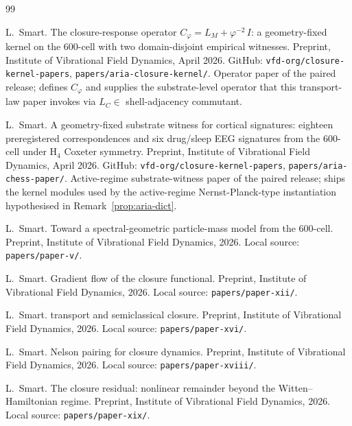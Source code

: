 \documentclass[11pt]{article}
\theoremstyle{definition}
\begin{document}

\begin{thebibliography}{99}

L.~Smart.
\newblock The closure-response operator $C_\varphi = L_M + \varphi^{-2}\, I$:
  a geometry-fixed kernel on the 600-cell with two domain-disjoint empirical
  witnesses.
\newblock Preprint, Institute of Vibrational Field Dynamics, April 2026.
\newblock GitHub: \texttt{vfd-org/closure-kernel-papers},
  \texttt{papers/aria-closure-kernel/}. Operator paper of the paired release;
  defines $C_\varphi$ and supplies the substrate-level operator that this
  transport-law paper invokes via $L_C \in$ shell-adjacency commutant.

L.~Smart.
\newblock A geometry-fixed substrate witness for cortical signatures: eighteen
  preregistered correspondences and six drug/sleep EEG signatures from the
  600-cell under H$_4$ Coxeter symmetry.
\newblock Preprint, Institute of Vibrational Field Dynamics, April 2026.
\newblock GitHub: \texttt{vfd-org/closure-kernel-papers},
  \texttt{papers/aria-chess-paper/}. Active-regime substrate-witness paper of the
  paired release; ships the kernel modules used by the active-regime
  Nernst-Planck-type instantiation hypothesised in Remark~\ref{prop:aria-dict}.

L.~Smart.
\newblock Toward a spectral-geometric particle-mass model from the 600-cell.
\newblock Preprint, Institute of Vibrational Field Dynamics, 2026.
\newblock Local source: \texttt{papers/paper-v/}.

L.~Smart.
\newblock Gradient flow of the closure functional.
\newblock Preprint, Institute of Vibrational Field Dynamics, 2026.
\newblock Local source: \texttt{papers/paper-xii/}.

L.~Smart.
 transport and semiclassical closure.
\newblock Preprint, Institute of Vibrational Field Dynamics, 2026.
\newblock Local source: \texttt{papers/paper-xvi/}.

L.~Smart.
\newblock Nelson pairing for closure dynamics.
\newblock Preprint, Institute of Vibrational Field Dynamics, 2026.
\newblock Local source: \texttt{papers/paper-xviii/}.

L.~Smart.
\newblock The closure residual: nonlinear remainder beyond the Witten--Hamiltonian regime.
\newblock Preprint, Institute of Vibrational Field Dynamics, 2026.
\newblock Local source: \texttt{papers/paper-xix/}.


\end{thebibliography}
\end{document}
